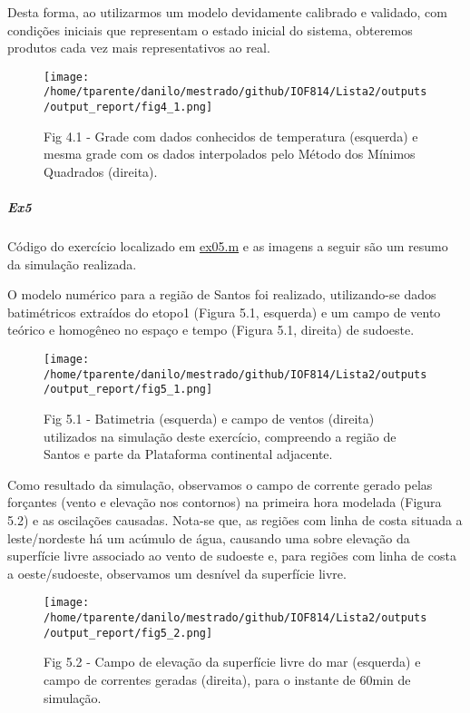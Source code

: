 \documentclass[11pt]{article}
\makeatletter
\def\maxwidth{\ifdim\Gin@nat@width>\linewidth\linewidth
    \else\Gin@nat@width\fi}
\let\Oldincludegraphics\includegraphics
\renewcommand{\includegraphics}[1]{\Oldincludegraphics[width=.8\maxwidth]{#1}}
\makeatother
\begin{document}
Desta forma, ao utilizarmos um modelo devidamente calibrado e validado,
com condições iniciais que representam o estado inicial do sistema,
obteremos produtos cada vez mais representativos ao real.

\begin{figure}[!ht]
\centering
\centerline{\hbox{\texttt{[image: /home/tparente/danilo/mestrado/github/IOF814/Lista2/outputs/output\_report/fig4\_1.png]}}}
\caption{Fig 4.1 - Grade com dados conhecidos de temperatura (esquerda) e mesma grade com os
dados interpolados pelo Método dos Mínimos Quadrados (direita).}
\label{fig4:1}
\end{figure}

\dotfill

    \subparagraph{Ex5}\label{ex5}

Código do exercício localizado em \href{../codes/ex05.m}{ex05.m} e as
imagens a seguir são um resumo da simulação realizada.

O modelo numérico para a região de Santos foi realizado, utilizando-se
dados batimétricos extraídos do etopo1 (Figura 5.1, esquerda) e um campo de vento
teórico e homogêneo no espaço e tempo (Figura 5.1, direita) de sudoeste.

\begin{figure}[!ht]
\centering
\centerline{\hbox{\texttt{[image: /home/tparente/danilo/mestrado/github/IOF814/Lista2/outputs/output\_report/fig5\_1.png]}}}
\caption{Fig 5.1 - Batimetria (esquerda) e campo de ventos (direita) utilizados na
simulação deste exercício, compreendo a região de Santos e parte da Plataforma
continental adjacente.}
\label{fig5:1}
\end{figure}

Como resultado da simulação, observamos o campo de corrente gerado pelas
forçantes (vento e elevação nos contornos) na primeira hora modelada
(Figura 5.2) e as oscilações causadas. Nota-se que, as regiões com linha
de costa situada a leste/nordeste há um acúmulo de água, causando uma
sobre elevação da superfície livre associado ao vento de sudoeste e,
para regiões com linha de costa a oeste/sudoeste, observamos um desnível
da superfície livre.

\begin{figure}[!ht]
\centering
\centerline{\hbox{\texttt{[image: /home/tparente/danilo/mestrado/github/IOF814/Lista2/outputs/output\_report/fig5\_2.png]}}}
\caption{Fig 5.2 - Campo de elevação da superfície livre do mar (esquerda) e campo de correntes
geradas (direita), para o instante de 60min de simulação.}
\label{fig5:2}
\end{figure}
\end{document}
